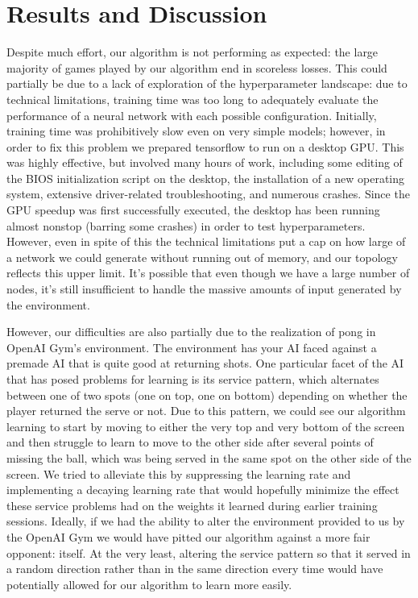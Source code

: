 \documentclass[12pt]{article}
\theoremstyle{plain}
\theoremstyle{definition}
\theoremstyle{remark}
\theoremstyle{plain}
\begin{document}
\section{Results and Discussion}
\par 
Despite much effort, our algorithm is not performing as expected: the large majority of games played by our algorithm end in scoreless losses.  This could partially be due to a lack of exploration of the hyperparameter landscape: due to technical limitations, training time was too long to adequately evaluate the performance of a neural network with each possible configuration.  Initially, training time was prohibitively slow even on very simple models; however, in order to fix this problem we prepared tensorflow to run on a desktop GPU. This was highly effective, but involved many hours of work, including some editing of the BIOS initialization script on the desktop, the installation of a new operating system, extensive driver-related troubleshooting, and numerous crashes.  Since the GPU speedup was first successfully executed, the desktop has been running almost nonstop (barring some crashes) in order to test hyperparameters. However, even in spite of this the technical limitations put a cap on how large of a network we could generate without running out of memory, and our topology reflects this upper limit.  It's possible that even though we have a large number of nodes, it's still insufficient to handle the massive amounts of input generated by the environment.
\par
However, our difficulties are also partially due to the realization of pong in OpenAI Gym's environment.  The environment has your AI faced against a premade AI that is quite good at returning shots.  One particular facet of the AI that has posed problems for learning is its service pattern, which alternates between one of two spots (one on top, one on bottom) depending on whether the player returned the serve or not.  Due to this pattern, we could see our algorithm learning to start by moving to either the very top and very bottom of the screen and then struggle to learn to move to the other side after several points of missing the ball, which was being served in the same spot on the other side of the screen.  We tried to alleviate this by suppressing the learning rate and implementing a decaying learning rate that would hopefully minimize the effect these service problems had on the weights it learned during earlier training sessions.  Ideally, if we had the ability to alter the environment provided to us by the OpenAI Gym we would have pitted our algorithm against a more fair opponent: itself.  At the very least, altering the service pattern so that it served in a random direction rather than in the same direction every time would have potentially allowed for our algorithm to learn more easily.
\end{document}
